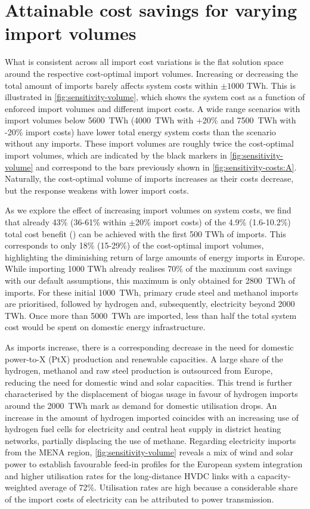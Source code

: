 \section*{Attainable cost savings for varying import volumes}

What is consistent across all import cost variations is the flat solution space
around the respective cost-optimal import volumes. Increasing or decreasing the
total amount of imports barely affects system costs within $\pm 1000$ TWh. This
is illustrated in \cref{fig:sensitivity-volume}, which shows the system cost as
a function of enforced import volumes and different import costs. A wide range
scenarios with import volumes below 5600~TWh (4000~TWh with +20\% and 7500~TWh
with -20\% import costs) have lower total energy system costs than the scenario
without any imports. These import volumes are roughly twice the cost-optimal
import volumes, which are indicated by the black markers in
\cref{fig:sensitivity-volume} and correspond to the bars previously shown in
\cref{fig:sensitivity-costs:A}. Naturally, the cost-optimal volume of imports
increases as their costs decrease, but the response weakens with lower import
costs.

As we explore the effect of increasing import volumes on system costs, we find
that already 43\% (36-61\% within $\pm$20\% import costs) of the 4.9\%
(1.6-10.2\%) total cost benefit () can be achieved with the first 500
TWh of imports. This corresponds to only 18\% (15-29\%) of the cost-optimal
import volumes, highlighting the diminishing return of large amounts of energy
imports in Europe. While importing 1000 TWh already realises 70\% of the maximum
cost savings with our default assumptions, this maximum is only obtained for
2800~TWh of imports. For these initial 1000~TWh, primary crude steel and
methanol imports are prioritised, followed by hydrogen and, subsequently,
electricity beyond 2000 TWh. Once more than 5000~TWh are imported, less than
half the total system cost would be spent on domestic energy infrastructure.

As imports increase, there is a corresponding decrease in the need for domestic
power-to-X (PtX) production and renewable capacities. A large share of the
hydrogen, methanol and raw steel production is outsourced from Europe, reducing
the need for domestic wind and solar capacities. This trend is further
characterised by the displacement of biogas usage in favour of hydrogen imports
around the 2000~TWh mark as demand for domestic  utilisation drops. An
increase in the amount of hydrogen imported coincides with an increasing use of
hydrogen fuel cells for electricity and central heat supply in district heating
networks, partially displacing the use of methane. Regarding electricity imports
from the MENA region, \cref{fig:sensitivity-volume} reveals a mix of wind and
solar power to establish favourable feed-in profiles for the European system
integration and higher utilisation rates for the long-distance HVDC links with a
capacity-weighted average of 72\%. Utilisation rates are high because a
considerable share of the import costs of electricity can be attributed to power
transmission.

